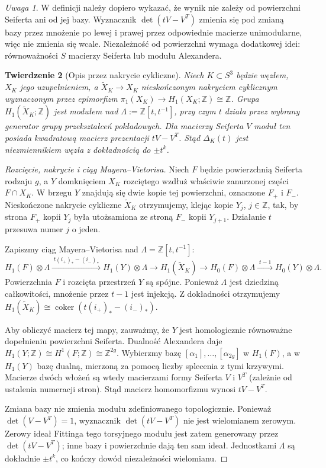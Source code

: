 \documentclass[11pt,a4paper]{report}
\numberwithin{equation}{section}
\theoremstyle{plain}
\newtheorem{twierdzenie}{Twierdzenie}[section]
\theoremstyle{definition}
\theoremstyle{remark}
\newtheorem{uwaga}[twierdzenie]{Uwaga}
\begin{document}
\begin{uwaga}
W definicji należy dopiero wykazać, że wynik nie zależy
od powierzchni Seiferta ani od jej bazy. Wyznacznik $\det(tV-V^T)$
zmienia się pod zmianą bazy przez mnożenie po lewej i prawej
przez odpowiednie macierze unimodularne, więc nie zmienia
się wcale. Niezależność od powierzchni wymaga dodatkowej idei:
równoważności $S$ macierzy Seiferta lub modułu Alexandera.
\end{uwaga}

\begin{twierdzenie}[Opis przez nakrycie cykliczne]
Niech $K\subset S^3$ będzie węzłem, $X_K$ jego uzupełnieniem,
a $\widetilde X_K\to X_K$ nieskończonym nakryciem cyklicznym
wyznaczonym przez epimorfizm
$\pi_1(X_K)\to H_1(X_K;\mathbb Z)\cong\mathbb Z$.
Grupa $H_1(\widetilde X_K;\mathbb Z)$ jest modułem nad
$\Lambda:=\mathbb Z[t,t^{-1}]$, przy czym $t$ działa przez
wybrany generator grupy przekształceń pokładowych. Dla
macierzy Seiferta $V$ moduł ten posiada kwadratową macierz
prezentacji $tV-V^T$. Stąd $\Delta_K(t)$ jest niezmiennikiem
węzła z dokładnością do $\pm t^k$.
\end{twierdzenie}

\begin{proof}[Rozcięcie, nakrycie i ciąg Mayera--Vietorisa]
Niech $F$ będzie powierzchnią Seiferta rodzaju $g$, a
$Y$ domknięciem $X_K$ rozciętego wzdłuż właściwie
zanurzonej części $F\cap X_K$. W brzegu $Y$ znajdują się
dwie kopie tej powierzchni, oznaczone $F_+$ i $F_-$.
Nieskończone nakrycie cykliczne $\widetilde X_K$ otrzymujemy,
klejąc kopie $Y_j$, $j\in\mathbb Z$, tak, by strona
$F_+$ kopii $Y_j$ była utożsamiona ze stroną $F_-$
kopii $Y_{j+1}$. Działanie $t$ przesuwa numer $j$ o jeden.

Zapiszmy ciąg Mayera--Vietorisa nad
$\Lambda=\mathbb Z[t,t^{-1}]$:
\[
H_1(F)\otimes\Lambda\xrightarrow{\;t(i_+)_*-(i_-)_*\;}
H_1(Y)\otimes\Lambda\longrightarrow
H_1(\widetilde X_K)\longrightarrow
H_0(F)\otimes\Lambda\xrightarrow{\;t-1\;}
H_0(Y)\otimes\Lambda.
\]
Powierzchnia $F$ i rozcięta przestrzeń $Y$ są spójne.
Ponieważ $\Lambda$ jest dziedziną całkowitości, mnożenie
przez $t-1$ jest injekcją. Z dokładności otrzymujemy
$H_1(\widetilde X_K)\cong\operatorname{coker}
(t(i_+)_*-(i_-)_*)$.

Aby obliczyć macierz tej mapy, zauważmy, że $Y$ jest
homologicznie równoważne dopełnieniu powierzchni Seiferta.
Dualność Alexandera daje
$H_1(Y;\mathbb Z)\cong H^1(F;\mathbb Z)\cong\mathbb Z^{2g}$.
Wybierzmy bazę $[\alpha_1],\dots,[\alpha_{2g}]$ w $H_1(F)$,
a w $H_1(Y)$ bazę dualną, mierzoną za pomocą liczby splecenia
z tymi krzywymi. Macierze dwóch włożeń są wtedy macierzami
formy Seiferta $V$ i $V^T$ (zależnie od ustalenia numeracji
stron). Stąd macierz homomorfizmu wynosi $tV-V^T$.

Zmiana bazy nie zmienia modułu zdefiniowanego topologicznie.
Ponieważ $\det(V-V^T)=1$, wyznacznik $\det(tV-V^T)$
nie jest wielomianem zerowym. Zerowy ideał Fittinga
tego torsyjnego modułu jest zatem generowany przez
$\det(tV-V^T)$; inne bazy i powierzchnie dają ten sam
ideał. Jednostkami $\Lambda$ są dokładnie $\pm t^k$,
co kończy dowód niezależności wielomianu.
\end{proof}
\end{document}
